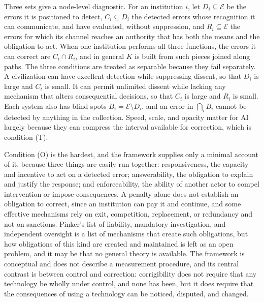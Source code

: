 \documentclass[11pt]{article}
\begin{document}
Three sets give a node-level diagnostic. For an institution $i$, let $D_i \subseteq \mathcal{E}$ be the errors it is positioned to detect, $C_i \subseteq D_i$ the detected errors whose recognition it can communicate, and have evaluated, without suppression, and $R_i \subseteq \mathcal{E}$ the errors for which its channel reaches an authority that has both the means and the obligation to act. When one institution performs all three functions, the errors it can correct are $C_i \cap R_i$, and in general $K$ is built from such pieces joined along paths. The three conditions are treated as separable because they fail separately. A civilization can have excellent detection while suppressing dissent, so that $D_i$ is large and $C_i$ is small. It can permit unlimited dissent while lacking any mechanism that alters consequential decisions, so that $C_i$ is large and $R_i$ is small. Each system also has blind spots $B_i = \mathcal{E}\setminus D_i$, and an error in $\bigcap_i B_i$ cannot be detected by anything in the collection. Speed, scale, and opacity matter for AI largely because they can compress the interval available for correction, which is condition (T).

Condition (O) is the hardest, and the framework supplies only a minimal account of it, because three things are easily run together: responsiveness, the capacity and incentive to act on a detected error; answerability, the obligation to explain and justify the response; and enforceability, the ability of another actor to compel intervention or impose consequences. A penalty alone does not establish an obligation to correct, since an institution can pay it and continue, and some effective mechanisms rely on exit, competition, replacement, or redundancy and not on sanctions. Pinker's list of liability, mandatory investigation, and independent oversight is a list of mechanisms that create such obligations, but how obligations of this kind are created and maintained is left as an open problem, and it may be that no general theory is available. The framework is conceptual and does not describe a measurement procedure, and its central contrast is between control and correction: corrigibility does not require that any technology be wholly under control, and none has been, but it does require that the consequences of using a technology can be noticed, disputed, and changed.
\end{document}
